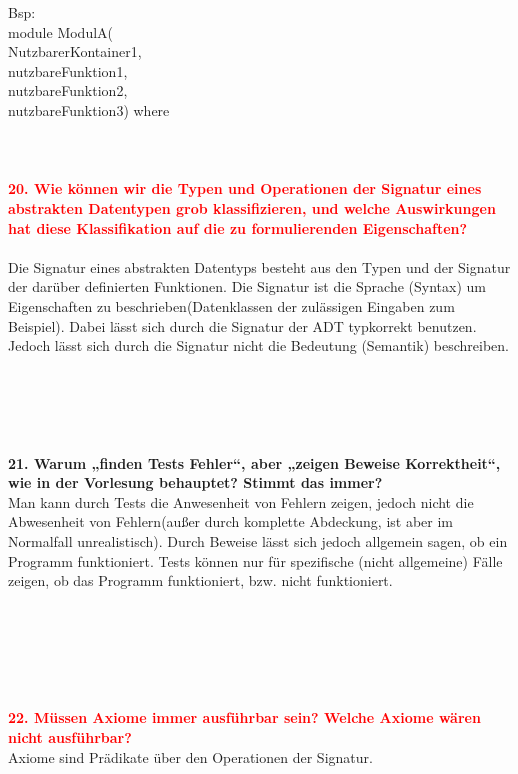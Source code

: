 \documentclass{article}
\begin{document}
Bsp:\\
module ModulA(\\
NutzbarerKontainer1,\\
nutzbareFunktion1,\\
nutzbareFunktion2,\\
nutzbareFunktion3) where\\
\\
\\
\\
    \textcolor{red}{\textbf{20. Wie können wir die Typen und Operationen der Signatur eines abstrakten Datentypen grob klassifizieren, und welche Auswirkungen hat diese Klassifikation auf die zu formulierenden Eigenschaften?}}
\\
\\
Die Signatur eines abstrakten Datentyps besteht aus den Typen und der Signatur der darüber definierten Funktionen. Die Signatur ist die Sprache (Syntax) um Eigenschaften zu beschrieben(Datenklassen der zul\"assigen Eingaben zum Beispiel). Dabei lässt sich durch die Signatur der ADT typkorrekt benutzen. Jedoch lässt sich durch die Signatur nicht die Bedeutung (Semantik) beschreiben.\\
\\
\\
\\
\\
\\
\textbf{21. Warum „finden Tests Fehler“, aber „zeigen Beweise Korrektheit“, wie in der Vorlesung behauptet? Stimmt das immer?}
\\
Man kann durch Tests die Anwesenheit von Fehlern zeigen, jedoch nicht die Abwesenheit von Fehlern(au\ss er durch komplette Abdeckung, ist aber im Normalfall unrealistisch). Durch Beweise lässt sich jedoch allgemein sagen, ob ein Programm funktioniert. Tests können nur für spezifische (nicht allgemeine) Fälle zeigen, ob das Programm funktioniert, bzw. nicht funktioniert. \\
\\
\\
\\
\\
\\
\\
\textcolor{red}{\textbf{22. Müssen Axiome immer ausführbar sein? Welche Axiome wären nicht ausführbar?}}
\\
Axiome sind Prädikate über den Operationen der Signatur.\\
\\
\\
\end{document}
